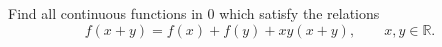 Find all continuous functions in $0$ which satisfy the relations
\[ f(x + y) = f(x) + f(y) + xy(x + y),\qquad x, y \in \mathbb{R}. \]
